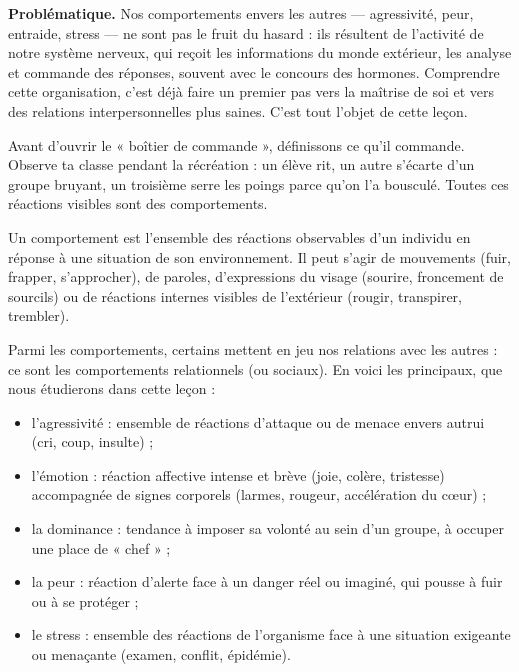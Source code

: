 \documentclass[11pt]{article}
\newcommand{\cle}[1]{{\popxbold\color{popdark}#1}}
\newcounter{popsec}
\newcounter{popsub}
\newcommand{\courssub}[1]{%
  \stepcounter{popsub}%
  \par\vspace{9pt}\noindent{\popxbold\fontsize{11.5}{13}\selectfont\color{popink}{\color{poporange}\thepopsec.\thepopsub}\hspace{6pt}#1}\par\nopagebreak\vspace{4pt}
}
\begin{document}
\textbf{Problématique.} Nos comportements envers les autres — agressivité, peur, entraide, stress — ne sont pas le fruit du hasard : ils résultent de l'activité de notre \cle{système nerveux}, qui reçoit les informations du monde extérieur, les analyse et commande des réponses, souvent avec le concours des \cle{hormones}. Comprendre cette organisation, c'est déjà faire un premier pas vers la maîtrise de soi et vers des relations interpersonnelles plus saines. C'est tout l'objet de cette leçon.

\courssub{La notion de comportement}

Avant d'ouvrir le « boîtier de commande », définissons ce qu'il commande. Observe ta classe pendant la récréation : un élève rit, un autre s'écarte d'un groupe bruyant, un troisième serre les poings parce qu'on l'a bousculé. Toutes ces réactions visibles sont des comportements.

\begin{definition}[Comportement]
Un \cle{comportement} est l'ensemble des réactions observables d'un individu en réponse à une situation de son environnement. Il peut s'agir de mouvements (fuir, frapper, s'approcher), de paroles, d'expressions du visage (sourire, froncement de sourcils) ou de réactions internes visibles de l'extérieur (rougir, transpirer, trembler).
\end{definition}

Parmi les comportements, certains mettent en jeu nos relations avec les autres : ce sont les \cle{comportements relationnels} (ou sociaux). En voici les principaux, que nous étudierons dans cette leçon :

\begin{itemize}
\item l'\cle{agressivité} : ensemble de réactions d'attaque ou de menace envers autrui (cri, coup, insulte) ;
\item l'\cle{émotion} : réaction affective intense et brève (joie, colère, tristesse) accompagnée de signes corporels (larmes, rougeur, accélération du cœur) ;
\item la \cle{dominance} : tendance à imposer sa volonté au sein d'un groupe, à occuper une place de « chef » ;
\item la \cle{peur} : réaction d'alerte face à un danger réel ou imaginé, qui pousse à fuir ou à se protéger ;
\item le \cle{stress} : ensemble des réactions de l'organisme face à une situation exigeante ou menaçante (examen, conflit, épidémie).
\end{itemize}
\end{document}
